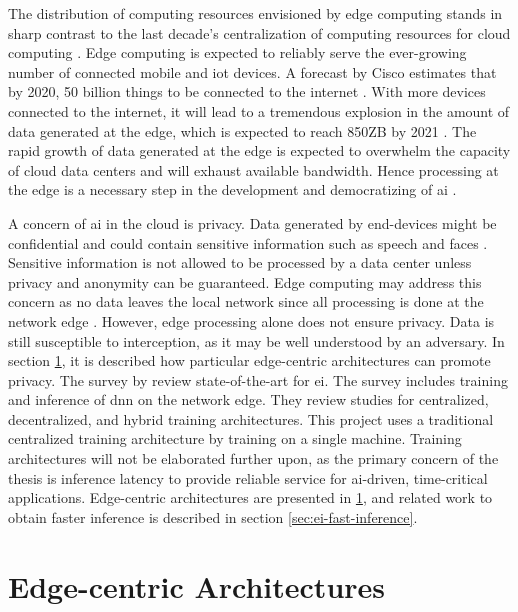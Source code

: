 The distribution of computing resources envisioned by edge computing stands in sharp contrast to the last decade's centralization of computing resources for cloud computing \cite{shi_edge_2016}. Edge computing is expected to reliably serve the ever-growing number of connected mobile and \gls{iot} devices. A forecast by Cisco estimates that by 2020, 50 billion things to be connected to the internet \cite{evans_internet_2011}. With more devices connected to the internet, it will lead to a tremendous explosion in the amount of data generated at the edge, which is expected to reach 850ZB by 2021 \cite{cisco_cisco_2018}. The rapid growth of data generated at the edge is expected to overwhelm the capacity of cloud data centers and will exhaust available bandwidth. Hence processing at the edge is a necessary step in the development and democratizing of \gls{ai} \cite{zhou_edge_2019}.

A concern of \gls{ai} in the cloud is privacy. Data generated by end-devices might be confidential and could contain sensitive information such as speech and faces \cite{chen_deep_2019}. Sensitive information is not allowed to be processed by a data center unless privacy and anonymity can be guaranteed. Edge computing may address this concern as no data leaves the local network since all processing is done at the network edge \cite{chen_deep_2019}. However, edge processing alone does not ensure privacy. Data is still susceptible to interception, as it may be well understood by an adversary. In section \ref{sec:ei-architecture}, it is described how particular edge-centric architectures can promote privacy. 
The survey  by \citet{zhou_edge_2019} review state-of-the-art for \gls{ei}. The survey includes training and inference of \gls{dnn} on the network edge. They review studies for centralized, decentralized, and hybrid training architectures. This project uses a traditional centralized training architecture by training on a single machine. Training architectures will not be elaborated further upon, as the primary concern of the thesis is inference latency to provide reliable service for \gls{ai}-driven, time-critical applications. Edge-centric architectures are presented in \ref{sec:ei-architecture}, and related work to obtain faster inference is described in section \ref{sec:ei-fast-inference}. 

\newpage
\section{Edge-centric Architectures} \label{sec:ei-architecture}

